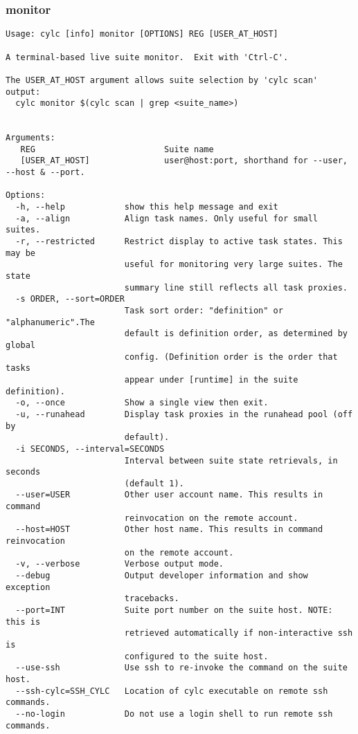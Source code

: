 \subsubsection{monitor}
\label{monitor}
\begin{lstlisting}
Usage: cylc [info] monitor [OPTIONS] REG [USER_AT_HOST] 

A terminal-based live suite monitor.  Exit with 'Ctrl-C'.

The USER_AT_HOST argument allows suite selection by 'cylc scan' output:
  cylc monitor $(cylc scan | grep <suite_name>)


Arguments:
   REG                          Suite name
   [USER_AT_HOST]               user@host:port, shorthand for --user, --host & --port.

Options:
  -h, --help            show this help message and exit
  -a, --align           Align task names. Only useful for small suites.
  -r, --restricted      Restrict display to active task states. This may be
                        useful for monitoring very large suites. The state
                        summary line still reflects all task proxies.
  -s ORDER, --sort=ORDER
                        Task sort order: "definition" or "alphanumeric".The
                        default is definition order, as determined by global
                        config. (Definition order is the order that tasks
                        appear under [runtime] in the suite definition).
  -o, --once            Show a single view then exit.
  -u, --runahead        Display task proxies in the runahead pool (off by
                        default).
  -i SECONDS, --interval=SECONDS
                        Interval between suite state retrievals, in seconds
                        (default 1).
  --user=USER           Other user account name. This results in command
                        reinvocation on the remote account.
  --host=HOST           Other host name. This results in command reinvocation
                        on the remote account.
  -v, --verbose         Verbose output mode.
  --debug               Output developer information and show exception
                        tracebacks.
  --port=INT            Suite port number on the suite host. NOTE: this is
                        retrieved automatically if non-interactive ssh is
                        configured to the suite host.
  --use-ssh             Use ssh to re-invoke the command on the suite host.
  --ssh-cylc=SSH_CYLC   Location of cylc executable on remote ssh commands.
  --no-login            Do not use a login shell to run remote ssh commands.

\end{lstlisting}
